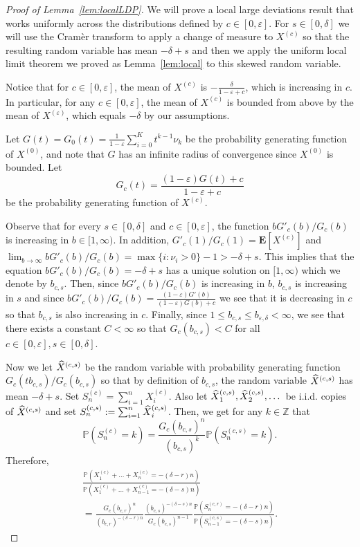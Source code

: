 \documentclass[AHL,Unicode,longabstracts,published]{cedram}
\newcommand{\Z}{\mathbb{Z}}
\renewcommand{\P}{\mathbb{P}}
\newcommand{\E}[1]{{\mathbf E}\left[#1\right]}
\providecommand{\eps}{}
\renewcommand{\eps}{\varepsilon}
\let\oldhat\hat
\renewcommand*{\hat}[1]{\mathchoice{\widehat{#1}}{\widehat{#1}}{\oldhat{#1}}{\oldhat{#1}}}
\begin{document}
\begin{proof}[Proof of Lemma~\ref{lem:localLDP}]
We will prove a local large deviations result that works uniformly across the distributions defined by $c\in [0,\eps]$. For $s\in [0,\delta]$ we will use the Cramèr transform to apply a change of measure to $X^{(c)}$ so that the resulting random variable has mean $-\delta+s$ and then we apply the uniform local limit theorem we proved as Lemma~\ref{lem:local} to this skewed random variable.

Notice that for $c\in [0,\varepsilon]$, the mean of $X^{(c)}$ is $- \frac{\delta}{1-\varepsilon+c}$, which is increasing in $c$. In particular, for any $c\in [0,\varepsilon]$, the mean of $X^{(c)}$ is bounded from above by the mean of $X^{(\varepsilon)}$, which equals $-\delta$ by our assumptions.

Let $G(t)=G_0(t)=\frac{1}{1-\varepsilon}\sum_{i=0}^K t^{k-1} \nu_k$ be the probability generating function of $X^{(0)}$, and note that $G$ has an infinite radius of convergence since $X^{(0)}$ is bounded. Let
\[
G_c(t)=\frac{(1-\varepsilon)G(t)+{c}}{1-\varepsilon+c}
\]
be the probability generating function of $X^{(c)}$.


Observe that for every $s\in[0,\delta]$ and $c\in [0,\varepsilon]$, {the function ${bG'_c(b)}/{G_c(b)}$ is increasing in $b\in[1,\infty)$. In addition, ${G'_c(1)}/{G_c(1)}=\E{X^{(c)}}$ and $\lim_{b\to\infty}{bG'_c(b)}/{G_c(b)}=\max\{i:\nu_i>0\}-1>-\delta+s$. This implies that} the equation ${bG'_c(b)}/{G_c(b)}=-\delta+s$ has a unique solution on $[1,\infty)$ which we denote by $b_{c,s}$. {Then, since ${bG'_c(b)}/{G_c(b)}$ is increasing in $b$, $b_{c,s}$ is increasing in $s$ and since ${bG'_c(b)}/{G_c(b)}=\frac{(1-\varepsilon)G'(b)}{(1-\varepsilon)G(b)+c}$ we see that it is decreasing in $c$ so that $b_{c,s}$ is also increasing in $c$.} {Finally, since $1\leq b_{c,s}\leq b_{\varepsilon,\delta}<\infty$, we see that there exists a constant $C<\infty$ so that $G_c(b_{c,s})<C$ for all $c\in [0,\varepsilon], s\in [0,\delta].$}

Now we let $\hat{X}^{(c,s)}$ be the random variable with probability generating function ${G_c(t b_{c,s})}/{G_c(b_{c,s})}$ so that by definition of $b_{c,s}$, the random variable $\hat{X}^{(c,s)}$ has mean $-\delta+s$. Set $S^{(c)}_n=\sum_{i=1}^n X^{(c)}_i$. Also let $\hat{X}^{(c,s)}_1, \hat{X}^{(c,s)}_2,\dots$ be i.i.d. copies of $\hat{X}^{(c,s)}$ and set $S^{(c,s)}_n:=\sum_{i=1}^n \hat{X}^{(c,s)}_i$. Then, we get for any $k\in \Z$ that
\[
\P\left(S^{(c)}_n=k\right)= \frac{G_c(b_{c,s})^n }{ (b_{c,s})^k}\P\left(S^{(c,s)}_n=k\right).
\]
Therefore,
\begin{multline}\label{eq:ratio_local_LDP}
\frac{\P\left(X^{(c)}_1+\dots+X^{(c)}_{n}= -(\delta-r)n\right)}{
\P\left(X^{(c)}_1+\dots+X^{(c)}_{n-1}=-(\delta-s)n\right)}\\
=\frac{G_c(b_{c,r})^n }{ (b_{c,r})^{ -(\delta-r)n }} \frac{ (b_{c,s})^{ -(\delta-s)n}}{ G_c(b_{c,s})^{n-1}} \frac{\P\left(S^{(c,r)}_n=-(\delta-r)n\right)}{ \P\left(S^{(c,s)}_{n-1}=-(\delta-s)n\right)}.
\end{multline}


\end{proof}
\end{document}

